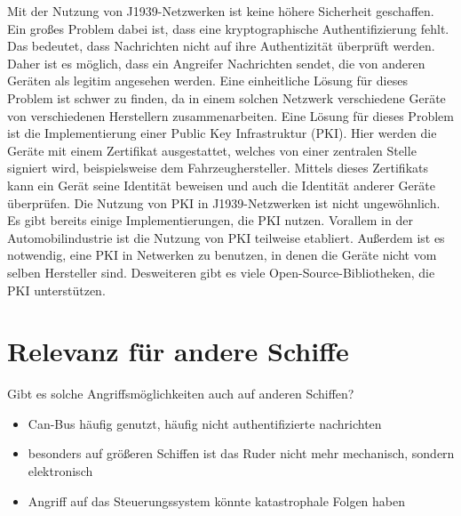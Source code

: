 Mit der Nutzung von J1939-Netzwerken ist keine höhere Sicherheit geschaffen. Ein großes Problem dabei ist, dass
eine kryptographische Authentifizierung fehlt. Das bedeutet, dass Nachrichten nicht auf ihre Authentizität überprüft werden.
Daher ist es möglich, dass ein Angreifer Nachrichten sendet, die von anderen Geräten als legitim angesehen werden.
Eine einheitliche Lösung für dieses Problem ist schwer zu finden, da in einem solchen Netzwerk verschiedene Geräte
von verschiedenen Herstellern zusammenarbeiten. Eine Lösung für dieses Problem ist die Implementierung einer Public Key Infrastruktur (PKI).
Hier werden die Geräte mit einem Zertifikat ausgestattet, welches von einer zentralen Stelle signiert wird, beispielsweise
dem Fahrzeughersteller. Mittels dieses Zertifikats kann ein Gerät seine Identität beweisen und auch die Identität anderer Geräte
überprüfen. 
Die Nutzung von PKI in J1939-Netzwerken ist nicht ungewöhnlich. Es gibt bereits einige Implementierungen, die PKI nutzen.
Vorallem in der Automobilindustrie ist die Nutzung von PKI teilweise etabliert. Außerdem ist es notwendig, eine PKI in 
Netwerken zu benutzen, in denen die Geräte nicht vom selben Hersteller sind.
Desweiteren gibt es viele Open-Source-Bibliotheken,
die PKI unterstützen. 
\cite{Murvay2018} \\
\section{Relevanz für andere Schiffe}
Gibt es solche Angriffsmöglichkeiten auch auf anderen Schiffen?
\begin{itemize}
    \item Can-Bus häufig genutzt, häufig nicht authentifizierte nachrichten
    \item besonders auf größeren Schiffen ist das Ruder nicht mehr mechanisch, sondern elektronisch
    \item Angriff auf das Steuerungssystem könnte katastrophale Folgen haben
\end{itemize}